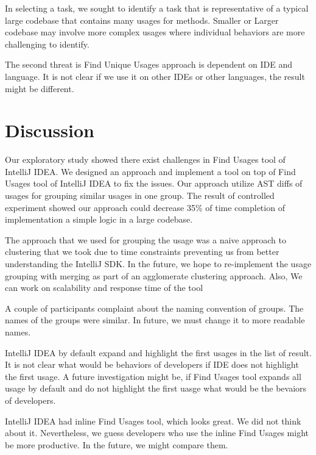 \documentclass[conference]{IEEEtran}
\begin{document}
In selecting a task, we sought to identify a task that is representative of a typical large codebase that contains many usages for methods. Smaller or Larger codebase may involve more complex usages where individual behaviors are more challenging to identify. \par 

The second threat is Find Unique Usages approach is dependent on IDE and language. It is not clear if we use it on other IDEs or other languages, the result might be different.\par 

\section{Discussion}
Our exploratory study showed there exist challenges in Find Usages tool of IntelliJ IDEA. We designed an approach and implement a tool on top of Find Usages tool of IntelliJ IDEA to fix the issues. Our approach utilize AST diffs of usages for grouping similar usages in one group. The result of controlled experiment showed our approach could decrease 35\% of time completion of implementation a simple logic in a large codebase.

The approach that we used for grouping the usage was a naive approach to clustering that we took due to time constraints preventing us from better understanding the IntelliJ SDK. In the future, we hope to re-implement the usage grouping with merging as part of an agglomerate clustering approach. Also, We can work on scalability and response time of the tool \par


A couple of participants complaint about the naming convention of groups. The names of the groups were similar. In future, we must change it to more readable names.\par

IntelliJ IDEA by default expand and highlight the first usages in the list of result. It is not clear what would be behaviors of developers if IDE does not highlight the first usage. A future investigation might be, if Find Usages tool expands all usage by default and do not highlight the first uasge what would be the bevaiors of developers.\par

IntelliJ IDEA had inline Find Usages tool, which looks great. We did not think about it. Nevertheless, we guess developers who use the inline Find Usages might be more productive. In the future, we might compare them. \par
\end{document}
